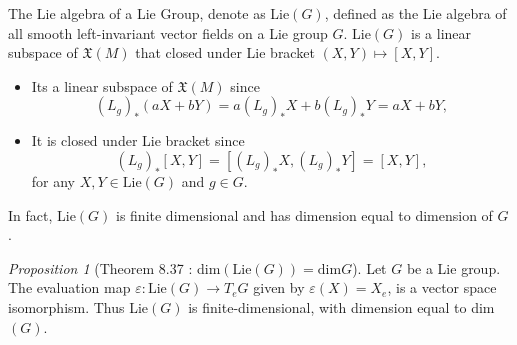 \documentclass[a4paper]{article}
\theoremstyle{remark}
\newtheorem{prop}{Proposition}
\newcommand{\VF}{\mathfrak{X}} %
\begin{document}
The Lie algebra of a Lie Group, denote as Lie$(G)$, defined as the Lie algebra of all smooth left-invariant vector fields on a Lie group $G$.  Lie$(G)$ is a linear subspace of $\VF(M)$ that closed under Lie bracket $(X,Y) \mapsto [X,Y]$.
\begin{itemize}
\item Its a linear subspace of $\VF(M)$ since
$$
(L_g)_*(aX+bY) = a(L_g)_*X + b (L_g)_*Y = aX + bY,
$$
\item It is closed under Lie bracket since
$$
(L_g)_*[X,Y] = [(L_g)_*X,(L_g)_*Y] = [X,Y],
$$
for any $X,Y \in \text{Lie}(G)$ and $g \in G$.
\end{itemize}
In fact, Lie$(G)$ is finite dimensional and has dimension equal to dimension of $G$.
\begin{prop}[Theorem 8.37 \cite{LeeSM} : dim$(\text{Lie}(G)) = \text{dim} G$] Let $G$ be a Lie group. The evaluation map $\varepsilon : \text{Lie}(G) \to T_eG$ given by $\varepsilon(X) = X_e$, is a vector space isomorphism. Thus Lie$(G)$ is finite-dimensional, with dimension equal to dim$(G)$.
\end{prop}
\end{document}
